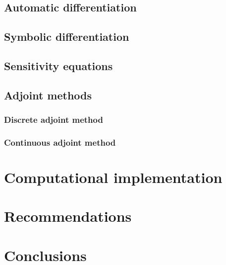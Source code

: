 \documentclass[12pt]{article}
\begin{document}
\subsection{Automatic differentiation}


\subsection{Symbolic differentiation}


\subsection{Sensitivity equations}


\subsection{Adjoint methods}
\label{section:adjoint-methods}


\subsubsection{Discrete adjoint method}


\subsubsection{Continuous adjoint method}


\section{Computational implementation}
\label{sec:computational-implementation}


\section{Recommendations}


\section{Conclusions}


\end{document}
